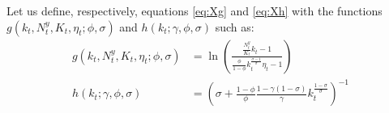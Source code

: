 Let us define, respectively, equations \eqref{eq:Xg} and \eqref{eq:Xh} with the functions $g(k_t, N_t^y, K_t, \eta_t; \phi, \sigma)$ and $h(k_t ; \gamma, \phi, \sigma)$ such as:
	\begin{align*}
		g(k_t, N_t^y, K_t, \eta_t; \phi, \sigma) &= \ln\left( \frac{ \frac{N_t^y}{K_t} k_t - 1 } { \frac{\phi}{1-\phi} k_t^{\frac{\sigma-1}{\sigma}} \eta_t - 1 }\right) \\
		h(k_t ; \gamma, \phi, \sigma) &= \left( \sigma + \frac{1-\phi}{\phi} \frac{1-\gamma(1-\sigma)}{\gamma} k_t^{\frac{1-\sigma}{\sigma}} \right)^{-1}
	\end{align*}


